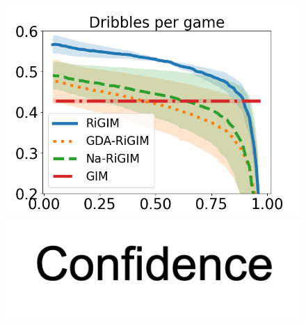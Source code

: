 \documentclass{article}
\begin{document}
\begin{figure}[htbp]
\begin{minipage}{0.16\textwidth}
    \includegraphics[scale=0.14]{figures/soccer_risk_curve_Drb_shadow.png}\par
    \vspace{-0.05in}
    \includegraphics[scale=0.12]{figures/confidence_x_label.png}
    \end{minipage}
    \begin{minipage}{0.01\textwidth}
    \centering

\end{minipage}
\end{figure}
\end{document}
